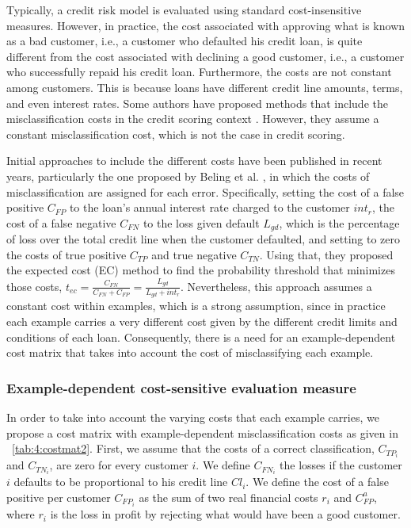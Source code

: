  Typically, a credit risk model is evaluated using standard cost-insensitive measures.
  However, in practice, the cost associated with approving 
  what is known as a bad customer, i.e., a customer who defaulted his credit loan, is quite 
  different from the cost associated with declining a good customer,  i.e., a customer who 
  successfully repaid his credit loan. Furthermore, the costs are not constant among customers. 
  This is because loans have different credit line amounts, terms, and even interest rates. Some 
  authors have proposed methods that include the misclassification costs in the credit scoring 
  context \citep{Verbraken2014,Alejo2013,Beling2005,Oliver2009}. However, they assume a constant 
  misclassification cost, which is not the case in credit scoring.
  
 
  Initial approaches to include the different costs have been published in recent years, 
  particularly the one proposed by Beling et al. \citep{Beling2005,Oliver2009}, in which the costs 
  of misclassification are assigned for each error. Specifically, setting the cost of a false 
  positive $C_{FP}$ to the loan's annual interest rate charged to the customer $int_r$, the cost of 
  a false negative $C_{FN}$ to the loss given default $L_{gd}$, which is the percentage of loss 
  over the total credit line when the customer defaulted, and setting to zero the costs of true 
  positive $C_{TP}$ and true negative $C_{TN}$. Using that, they proposed the expected cost (EC) 
  method to find the probability threshold that minimizes those costs, $t_{ec}= 
  \frac{C_{FN}}{C_{FN}+C_{FP}} =\frac{L_{gd}}{L_{gd}+int_r}.$ Nevertheless, this approach assumes 
  a constant cost within examples, which is a strong assumption, since in practice each example 
  carries a very different cost given by the different credit limits and conditions of each loan. 
  Consequently, there is a need for an example-dependent cost matrix that takes into account the 
  cost of misclassifying each example.
  
  
  \subsubsection{Example-dependent cost-sensitive evaluation measure}
  
  In order to take into account the varying costs that each example carries, we propose 
  a cost matrix with example-dependent misclassification costs as 
  given in \tablename{~\ref{tab:4:costmat2}}. First, we assume that the costs of a correct 
  classification, $C_{TP_i}$ and $C_{TN_i}$, are zero for every customer $i$. We define $C_{FN_i}$ 
   the losses if the customer $i$ defaults to be proportional to his credit line $Cl_i$. We 
  define the cost of a false positive per customer $C_{FP_i}$ as the sum of two real financial 
  costs $r_i$ and $C^a_{FP}$, where $r_i$ is the loss in profit by rejecting what would have been a 
  good customer. 
  
